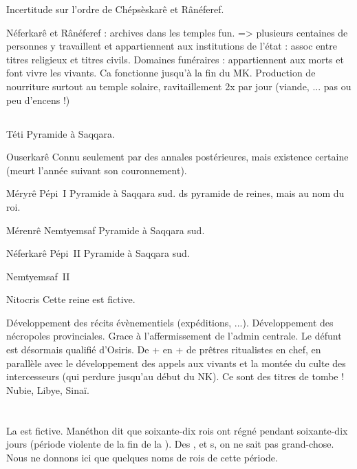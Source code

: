 Incertitude sur l'ordre de Chépsèskarê et Rânéferef.

Néferkarê et Rânéferef : archives dans les temples fun. => plusieurs 
centaines de personnes y travaillent et appartiennent aux institutions 
de l'état : assoc entre titres religieux et titres civils. Domaines 
funéraires : appartiennent aux morts et font vivre les vivants. Ca 
fonctionne jusqu'à la fin du MK.
Production de nourriture surtout au temple solaire, ravitaillement 2x
par jour (viande, ... pas ou peu d'encens !)

\subsection{\texorpdfstring{}{VIe dynastie}}

\begin{listerois}
  \item [Téti] Pyramide à Saqqara.
  \item [Ouserkarê] Connu seulement par des annales postérieures, 
        mais existence certaine (meurt l'année suivant son 
        couronnement).
  \item [Méryrê Pépi~I\ier] Pyramide à Saqqara sud.
        \TP ds pyramide de reines, mais au nom du roi.
  \item [Mérenrê Nemtyemsaf] Pyramide à Saqqara sud.
  \item [Néferkarê Pépi~II] Pyramide à Saqqara sud.
  \item [Nemtyemsaf~II]
  \item [Nitocris] Cette reine est fictive.
\end{listerois}

Développement des récits évènementiels (expéditions, ...).
Développement des nécropoles provinciales. Grace à l'affermissement 
de l'admin centrale. 
Le défunt est désormais qualifié d'Osiris.
De + en + de prêtres ritualistes en chef, en parallèle avec le 
développement des appels aux vivants et la montée du culte des 
intercesseurs (qui perdure jusqu'au début du NK). Ce sont des titres 
de tombe ! 
Nubie, Libye, Sinaï.

\section{\PPI}


La  est fictive. Manéthon dit que soixante-dix rois ont 
régné pendant soixante-dix jours (période violente de la fin de la 
).
Des \ieme, \ieme et s, on ne sait pas 
grand-chose. Nous ne donnons ici que quelques noms de rois de cette 
période.

